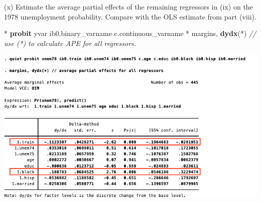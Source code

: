 \documentclass[
  10pt,
  ignorenonframetext,
]{beamer}
\newenvironment{Shaded}{\begin{snugshade}}{\end{snugshade}}
\newcommand{\CommentTok}[1]{\textcolor[rgb]{0.56,0.35,0.01}{\textit{#1}}}
\newcommand{\KeywordTok}[1]{\textcolor[rgb]{0.13,0.29,0.53}{\textbf{#1}}}
\newcommand{\NormalTok}[1]{#1}
\begin{document}
\begin{frame}{(x) Estimate the average partial effects of the remaining
regressors in (ix) on the 1978 unemployment probability. Compare with
the OLS estimate from part (viii).}
\protect\hypertarget{x-estimate-the-average-partial-effects-of-the-remaining-regressors-in-ix-on-the-1978-unemployment-probability.-compare-with-the-ols-estimate-from-part-viii.}{}
\end{frame}

\begin{frame}[fragile]{}
\protect\hypertarget{section-1}{}
\small

\begin{Shaded}
\begin{Highlighting}[]
\NormalTok{* }\KeywordTok{probit}\NormalTok{ yvar ib0.binary\_varname c.continuous\_varname}
\NormalTok{* margins, }\KeywordTok{dydx}\NormalTok{(*)}
\CommentTok{// use (*) to calculate APE for all regressors.}
\end{Highlighting}
\end{Shaded}

\begin{center}\includegraphics[width=1\linewidth]{pictures/PROBITallAPE} \end{center}
\end{frame}
\end{document}
